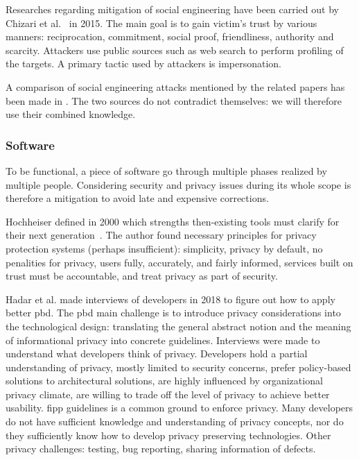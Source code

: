 Researches regarding mitigation of social engineering have been carried out by Chizari et al.~\cite{chizari_social_2015} in 2015. The main goal is to gain victim's trust by various manners: reciprocation, commitment, social proof, friendliness, authority and scarcity. Attackers use public sources such as web search to perform profiling of the targets. A primary tactic used by attackers is impersonation. %

A comparison of social engineering attacks mentioned by the related papers has been made in . The two sources do not contradict themselves: we will therefore use their combined knowledge.

\subsubsection{Software}
\label{subsubsec:state_review_results_software}

To be functional, a piece of software go through multiple phases realized by multiple people. Considering security and privacy issues during its whole scope is therefore a mitigation to avoid late and expensive corrections.

Hochheiser defined in 2000 which strengths then-existing tools must clarify for their next generation~\cite{hochheiser_principles_2000}. The author found necessary principles for privacy protection systems (perhaps insufficient): simplicity, privacy by default, no penalities for privacy, users fully, accurately, and fairly informed, services built on trust must be accountable, and treat privacy as part of security. %

Hadar et al. \cite{hadar_privacy_2018} made interviews of developers in 2018 to figure out how to apply better \gls{pbd}. The \gls{pbd} main challenge is to introduce privacy considerations into the technological design: translating the general abstract notion and the meaning of informational privacy into concrete guidelines. Interviews were made to understand what developers think of privacy. Developers hold a partial understanding of privacy, mostly limited to security concerns, prefer policy-based solutions to architectural solutions, are highly influenced by organizational privacy climate, are willing to trade off the level of privacy to achieve better usability. \gls{fipp} guidelines is a common ground to enforce privacy. Many developers do not have sufficient knowledge and understanding of privacy concepts, nor do they sufficiently know how to develop privacy preserving technologies. Other privacy challenges: testing, bug reporting, sharing information of defects. %

